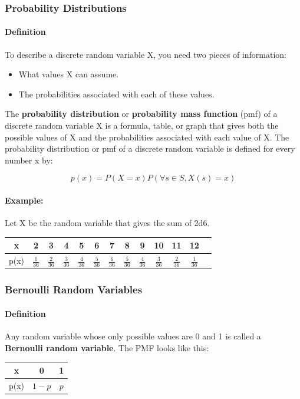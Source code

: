 \subsubsection*{Probability Distributions}
\paragraph*{Definition}
To describe a discrete random variable X, you need two pieces of information:
\begin{itemize}
    \item What values X can assume.
    \item The probabilities associated with each of these values.
\end{itemize}

The \textbf{probability distribution} or \textbf{probability mass function} (pmf) of a discrete random variable X
is a formula, table, or graph that gives both the possible values of X and the probabilities associated with each value 
of X. The probability distribution or pmf of a discrete random variable is defined for every number x by:

\[
    p(x) = P(X = x) P(\forall s \in S, X(s) = x)
\]

\paragraph*{Example:}
Let X be the random variable that gives the sum of 2d6.
\begin{table}[h!]
    \centering
    \begin{tabular}{c|c|c|c|c|c|c|c|c|c|c|c|c}
        x & 2 & 3 & 4 & 5 & 6 & 7 & 8 & 9 & 10 & 11 & 12 \\
        \hline
        p(x) & $\frac{1}{36}$ & $\frac{2}{36}$ & $\frac{3}{36}$ & $\frac{4}{36}$ & $\frac{5}{36}$ & $\frac{6}{36}$ & $\frac{5}{36}$ & $\frac{4}{36}$ & $\frac{3}{36}$ & $\frac{2}{36}$ & $\frac{1}{36}$
    \end{tabular}
\end{table}

\pagebreak

\subsubsection*{Bernoulli Random Variables}
\paragraph*{Definition}
Any random variable whose only possible values are 0 and 1 is called a \textbf{Bernoulli random variable}.
The PMF looks like this:
\begin{table}[h!]
    \centering
    \begin{tabular}{c|c|c}
        x & 0 & 1 \\
        \hline
        p(x) & $1-p$ & $p$
    \end{tabular}
\end{table}

